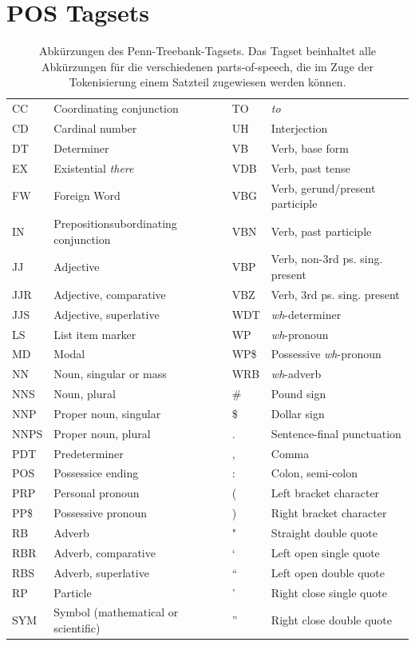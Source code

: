 \documentclass[
	a4paper,
	12pt,
	bibliography=totocnumbered,
	twoside,
]{scrreprt}
\begin{document}
\section{POS Tagsets}
\label{app:pos-tagsets}
\begin{table}[H]
	\centering
	\begin{tabular}{ |p{1cm} p{5cm}|p{1cm} p{5cm}|  }
		\hline
		\rowcolor{tubs_blue_light}
		\multicolumn{4}{|c|}{\textbf{The Penn Treebank POS tagset\footnotemark}} \\
		\hline
		CC&Coordinating conjunction&TO&\textit{to}\\
		CD&Cardinal number&UH&Interjection\\
		DT&Determiner&VB&Verb, base form\\
		EX&Existential \textit{there}&VDB&Verb, past tense\\
		FW&Foreign Word&VBG&Verb, gerund/present participle\\
		IN&Preposition\/subordinating conjunction&VBN&Verb, past participle\\
		JJ&Adjective&VBP&Verb, non-3rd ps. sing. present\\
		JJR&Adjective, comparative&VBZ&Verb, 3rd ps. sing. present\\
		JJS&Adjective, superlative&WDT&\textit{wh}-determiner\\
		LS&List item marker&WP&\textit{wh}-pronoun\\
		MD&Modal&WP\$ &Possessive \textit{wh}-pronoun\\
		NN&Noun, singular or mass&WRB&\textit{wh}-adverb\\
		NNS&Noun, plural&\# &Pound sign\\
		NNP&Proper noun, singular&\$ &Dollar sign\\
		NNPS&Proper noun, plural&.&Sentence-final punctuation\\
		PDT&Predeterminer&,&Comma\\
		POS&Possessice ending&:&Colon, semi-colon\\
		PRP&Personal pronoun&(&Left bracket character\\
		PP\$ &Possessive pronoun&)&Right bracket character\\
		RB&Adverb&" &Straight double quote\\
		RBR&Adverb, comparative&`&Left open single quote\\
		RBS&Adverb, superlative&``&Left open double quote\\
		RP&Particle&'&Right close single quote\\
		SYM&Symbol (mathematical or scientific)&''&Right close double quote\\
		\hline
	\end{tabular}
	\caption[Abkürzungen des Penn-Treebank-Tagsets]{Abkürzungen des Penn-Treebank-Tagsets. Das Tagset beinhaltet alle Abkürzungen für die verschiedenen parts-of-speech, die im Zuge der Tokenisierung einem Satzteil zugewiesen werden können.}
	\label{tab:pos-tagsets}
\end{table}
\end{document}
